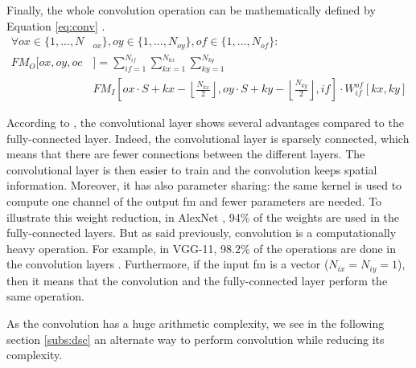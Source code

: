 Finally, the whole convolution operation can be mathematically defined by Equation \eqref{eq:conv} \cite{abdelouahab_accelerating_2018}.
%
{\small
\begin{equation}
    \begin{split}
        \forall ox \in \{ 1, ..., N&_{ox} \}, oy \in \{ 1, ..., N_{oy} \}, of \in \{ 1, ..., N_{of} \}: \\
        FM_O[ox, oy, oc&] = \sum^{N_{if}}_{if=1}
        \sum^{N_{kx}}_{kx=1}
        \sum^{N_{ky}}_{ky=1}\\
        & FM_I \left[ ox \cdot S + kx - \left\lfloor \frac{N_{kx}}{2} \right\rfloor,  oy \cdot S + ky - \left\lfloor \frac{N_{ky}}{2} \right\rfloor, if \right] \cdot
        W^{of}_{if} \left[ kx, ky \right]
    \end{split}
    \label{eq:conv}
\end{equation}
}

According to \textcite{goodfellow_deep_2016}, the convolutional layer shows several advantages compared to the fully-connected layer. Indeed, the convolutional layer is sparsely connected, which means that there are fewer connections between the different layers. The convolutional layer is then easier to train and the convolution keeps spatial information. Moreover, it has also parameter sharing: the same kernel is used to compute one channel of the output \acrshort{fm} and fewer parameters are needed. To illustrate this weight reduction, in AlexNet \cite{krizhevsky_imagenet_2012}, 94\% of the weights are used in the fully-connected layers. But as said previously, convolution is a computationally heavy operation. For example, in VGG-11, 98.2\% of the operations are done in the convolution layers \cite{guo_survey_2018}. Furthermore, if the input \acrshort{fm} is a vector ($N_{ix} = N_{iy} = 1$), then it means that the convolution and the fully-connected layer perform the same operation.

As the convolution has a huge arithmetic complexity, we see in the following section \ref{subs:dsc} an alternate way to perform convolution while reducing its complexity.
